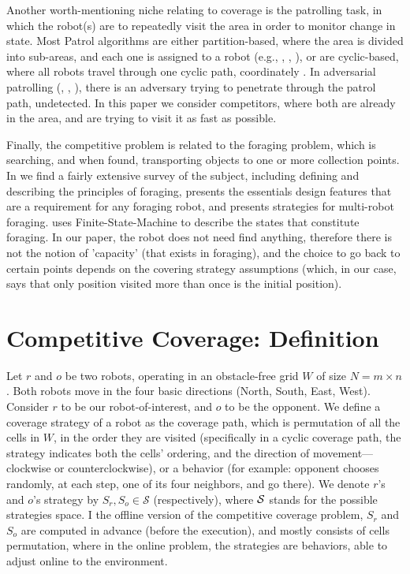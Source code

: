 \documentclass[a4paper,english,10pt]{article}
\newcommand\rob{\ensuremath{r}\xspace}
\newcommand\opp{\ensuremath{o}\xspace}
\newcommand{\w}{\ensuremath{W}\xspace}
\begin{document}
Another worth-mentioning niche relating to coverage is the patrolling task, in which the robot(s) are to repeatedly visit the area in order to monitor change in state. Most Patrol algorithms are either partition-based, where the area is divided into sub-areas, and each one is assigned to a robot (e.g., \cite{guo2004towards}, \cite{guo2004coverage}, \cite{jung2002tracking}), or are cyclic-based, where all robots travel through one cyclic path, coordinately \cite{chevaleyre2004theoretical}. 
In adversarial patrolling (\cite{agmon2011multi}, \cite{sless2014multi}, \cite{agmon2008multi}), there is an adversary trying to penetrate through the patrol path, undetected. In this paper we consider competitors, where both are already in the area, and are trying to visit it as fast as possible. %

Finally, the competitive problem is related to the foraging problem, which is searching, and when found, transporting objects to one or more collection points. In \cite{winfield2009foraging} we find a fairly extensive survey of the subject, including defining and describing the principles of foraging, presents the essentials design features that are a requirement for any foraging robot, and presents strategies for multi-robot foraging. \cite{winfield2009foraging} uses Finite-State-Machine to describe the states that constitute foraging. In our paper, the robot does not need find anything, therefore there is not the notion of 'capacity' (that exists in foraging), and the choice to go back to certain points depends on the covering strategy assumptions (which, in our case, says that only position visited more than once is the initial position).


\section{Competitive Coverage: Definition}
Let \rob and \opp be two robots, operating in an obstacle-free grid \w of size $N=m \times n$. Both robots move in the four basic directions (North, South, East, West). Consider \rob to be our robot-of-interest, and \opp to be the opponent. 
We define a coverage strategy of a robot as the coverage path, which is permutation of all the cells in \w, in the order they are visited (specifically in a cyclic coverage path, the strategy indicates both the cells' ordering, and the direction of movement---clockwise or counterclockwise), or a behavior (for example: opponent chooses randomly, at each step, one of its four neighbors, and go there). We denote \rob's and \opp's strategy by $S_\rob,S_\opp\in \mathcal{S}$ (respectively), where $\cal{S}$ stands for the possible strategies space. I the offline version of the competitive coverage problem, $S_\rob$ and $S_\opp$ are computed in advance (before the execution), and mostly consists of cells permutation, where in the online problem, the strategies are behaviors, able to adjust online to the environment.
\end{document}
